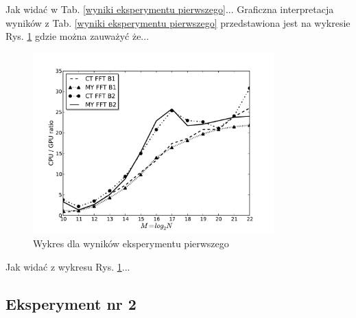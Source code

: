 \documentclass[12pt]{article}
\begin{document}
\noindent Jak widać w Tab. \ref{wyniki eksperymentu pierwszego}...\newline
Graficzna interpretacja wyników z Tab. \ref{wyniki eksperymentu pierwszego} 
przedstawiona jest na wykresie Rys. \ref{rysunek do eksperymentu pierwszego} gdzie  można zauważyć że...
\begin{figure}[h!]
 \centering
 \includegraphics[width=9.3cm]{wykres.pdf}
 \vspace{-0.3cm}
 \caption{Wykres dla wyników eksperymentu pierwszego}
 \label{rysunek do eksperymentu pierwszego}
\end{figure}

\noindent Jak widać z wykresu Rys. \ref{rysunek do eksperymentu pierwszego}...\newline


\newpage
\subsection{Eksperyment nr 2}
\end{document}

